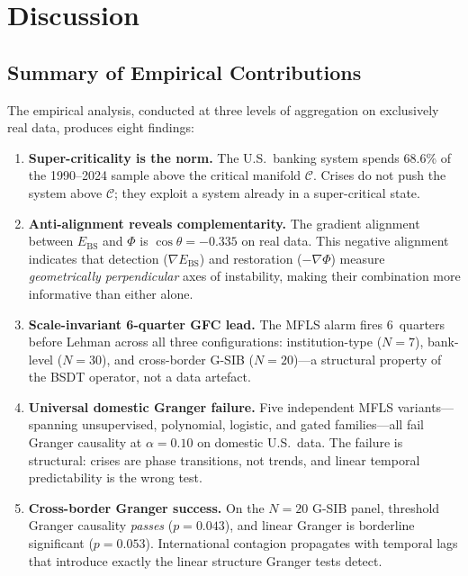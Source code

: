 \documentclass[11pt]{article}
\theoremstyle{definition}
\newcommand{\grad}{\nabla}
\newcommand{\Ebs}{E_{\mathrm{BS}}}
\newcommand{\Cman}{\mathcal{C}}
\newcommand{\costheta}{\cos\theta}
\begin{document}
\section{Discussion}
\label{sec:discussion}

\subsection{Summary of Empirical Contributions}

The empirical analysis, conducted at three levels of aggregation on
exclusively real data, produces eight findings:

\begin{enumerate}
  \item \textbf{Super-criticality is the norm.}  The U.S.\ banking system
    spends 68.6\% of the 1990--2024 sample above the critical manifold
    $\Cman$.  Crises do not push the system above $\Cman$; they exploit
    a system already in a super-critical state.

  \item \textbf{Anti-alignment reveals complementarity.}
    The gradient alignment between $\Ebs$ and $\Phi$ is $\costheta = -0.335$
    on real data.  This negative alignment indicates that detection
    ($\grad\Ebs$) and restoration ($-\grad\Phi$) measure \emph{geometrically
    perpendicular} axes of instability, making their combination more
    informative than either alone.

  \item \textbf{Scale-invariant 6-quarter GFC lead.}  The MFLS alarm fires
    6~quarters before Lehman across all three configurations: institution-type
    ($N=7$), bank-level ($N=30$), and cross-border G-SIB ($N=20$)---a
    structural property of the BSDT operator, not a data artefact.

  \item \textbf{Universal domestic Granger failure.}  Five independent MFLS
    variants---spanning unsupervised, polynomial, logistic, and gated
    families---all fail Granger causality at $\alpha = 0.10$ on domestic
    U.S.\ data.  The failure is structural: crises are phase transitions,
    not trends, and linear temporal predictability is the wrong test.

  \item \textbf{Cross-border Granger success.}  On the $N=20$ G-SIB panel,
    threshold Granger causality \emph{passes} ($p = 0.043$), and linear
    Granger is borderline significant ($p = 0.053$).  International contagion
    propagates with temporal lags that introduce exactly the linear structure
    Granger tests detect.


\end{enumerate}
\end{document}
